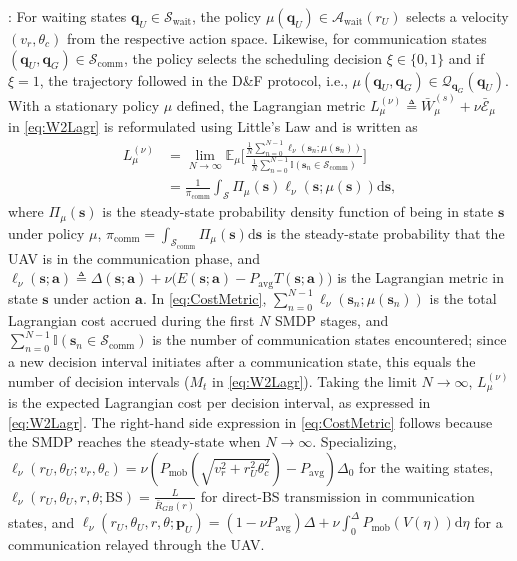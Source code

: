 \documentclass[10pt, twocolumn]{IEEEtran}
\theoremstyle{plain}
\theoremstyle{definition}
\theoremstyle{remark}
\begin{document}
: For waiting states $\mathbf{q}_{U}{\in}\mathcal{S}_{\mathrm{wait}}$, the policy  $\mu(\mathbf{q}_{U}){\in}\mathcal{A}_{\mathrm{wait}}(r_{U})$ selects a velocity $(v_{r},\theta_{c})$ from the respective action space. Likewise, for communication states $(\mathbf{q}_{U},\mathbf{q}_{G}){\in}\mathcal{S}_{\mathrm{comm}}$, the policy selects the scheduling decision $\xi{\in}\{0,1\}$ and if $\xi{=}1$, the trajectory followed in the D\&F protocol, i.e., $\mu(\mathbf{q}_{U},\mathbf{q}_{G}){\in} \mathcal Q_{\mathbf q_G} (\mathbf q_U)$. With a stationary policy $\mu$ defined, the Lagrangian metric $L_{\mu}^{(\nu)}{\triangleq}\bar{W}_{\mu}^{(s)}{+}\nu\bar{\mathcal E}_{\mu}$ in \eqref{eq:W2Lagr} is reformulated using Little's Law \cite{LittlesLaw} and is written as 
\begin{align}\label{eq:CostMetric}
    L_\mu^{(\nu)} &= \lim_{N \rightarrow \infty} \mathbb{E}_\mu \Bigg[ \frac{\frac{1}{N}\sum_{n=0}^{N-1}  \ell_\nu(\mathbf{s}_n; \mu(\mathbf{s}_n)) }{\frac{1}{N}\sum_{n = 0}^{N-1} \mathbb I(\mathbf{s}_n \in \mathcal{S}_{\mathrm{comm}})}  \Bigg] \\&= \frac{1}{\pi_{\mathrm{comm}}}\int_{\mathcal{S}} \Pi_{\mu}(\mathbf{s})\ell_\nu(\mathbf{s}; \mu(\mathbf{s}))\mathrm{d}\mathbf{s},
\end{align}
where $\Pi_{\mu}(\mathbf{s})$ is the steady-state probability density function of being in state $\mathbf{s}$ under policy $\mu$, $\pi_{\mathrm{comm}}{=}\int_{\mathcal{S}_{\mathrm{comm}}}\!\!\!\!\!\Pi_{\mu}(\mathbf{s})\mathrm{d}\mathbf{s}$ is the steady-state probability that the UAV is in the communication phase, and $\ell_{\nu}(\mathbf{s};\mathbf{a}){\triangleq}\Delta(\mathbf{s};\mathbf{a}){+}\nu\big(E(\mathbf{s};\mathbf{a}){-}P_{\mathrm{avg}}T(\mathbf{s};\mathbf{a})\big)$ is the Lagrangian metric in state $\mathbf{s}$ under action $\mathbf{a}$. In \eqref{eq:CostMetric}, $\sum_{n=0}^{N{-}1}\ell_{\nu}(\mathbf{s}_{n};\mu(\mathbf{s}_{n}))$ is the total Lagrangian cost accrued during the first $N$ SMDP stages, and $\sum_{n{=}0}^{N{-}1}\mathbb{I}(\mathbf{s}_{n}{\in}\mathcal{S}_{\mathrm{comm}})$ is the number of communication states encountered; since a new decision interval initiates after a communication state, this equals the number of decision intervals ($M_t$ in \eqref{eq:W2Lagr}). Taking the limit $N{\to}\infty$, $L_{\mu}^{(\nu)}$ is the expected Lagrangian cost per decision interval, as expressed in \eqref{eq:W2Lagr}. The right-hand side expression in \eqref{eq:CostMetric} follows because the SMDP reaches the steady-state when $N{\to}\infty$. Specializing, $\ell_{\nu}(r_{U},\theta_{U};v_{r},\theta_{c}){=}\nu(P_{\mathrm{mob}}(\sqrt{v_{r}^{2}{+}r_{U}^{2}\theta_{c}^{2}}){-}P_{\mathrm{avg}})\Delta_{0}$ for the waiting states, $\ell_{\nu}(r_{U},\theta_{U},r,\theta; \mathrm{BS}){=}\frac{L}{\bar{R}_{GB}(r)}$ for direct-BS transmission in communication states, and $\ell_{\nu}(r_{U},\theta_{U},r,\theta;\mathbf{p}_{U}){=}(1{-}\nu P_{\mathrm{avg}})\Delta{+}\nu\int_{0}^\Delta P_{\mathrm{mob}}\left(V(\eta)\right)\mathrm{d}\eta$ for a communication  relayed through the UAV.
\end{document}
